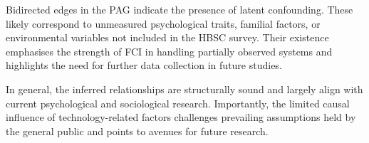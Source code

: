 \documentclass[main.tex]{subfiles}
\begin{document}
Bidirected edges in the PAG indicate the presence of latent confounding. These likely correspond to unmeasured psychological traits, familial factors, or environmental variables not included in the HBSC survey. Their existence emphasises the strength of FCI in handling partially observed systems and highlights the need for further data collection in future studies.

In general, the inferred relationships are structurally sound and largely align with current psychological and sociological research. Importantly, the limited causal influence of technology-related factors challenges prevailing assumptions held by the general public and points to avenues for future research.
\end{document}
